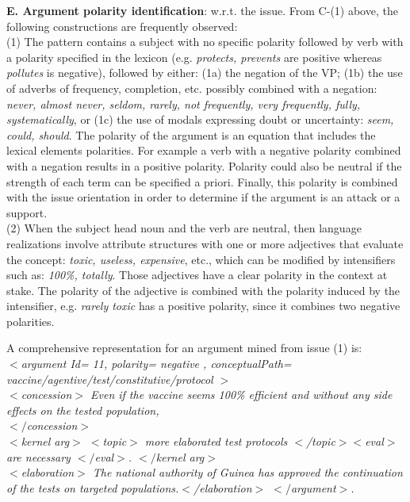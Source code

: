 \documentclass[11pt,letterpaper]{article}
\begin{document}
{\bf E.  Argument polarity identification}: %
 w.r.t. the issue. From C-(1) above,
the following constructions are frequently observed:\\
(1) The pattern contains a subject with no specific polarity followed by verb with a  polarity specified in the lexicon (e.g. {\it  protects, prevents} are positive whereas {\it pollutes} is negative), followed by either: (1a) the negation of the VP;
(1b) the use of adverbs of frequency, completion, etc. possibly combined with a negation: {\it  never, almost never, seldom, rarely, not frequently, very frequently, fully, systematically}, or (1c) the
use of modals expressing doubt or uncertainty: {\it seem, could, should}. The polarity of the argument is an equation that includes the lexical elements polarities. For example a verb with a negative polarity combined with a negation results in a positive polarity. Polarity could also be neutral if the strength of each term can be specified a priori. Finally, this polarity is combined with the issue orientation in order to determine if the argument is an attack or a support. \\
(2) When the subject head noun and the verb are neutral, then language realizations involve attribute structures with one or more adjectives that evaluate the concept: {\it toxic, useless, expensive}, etc., which can
be modified by intensifiers such as: {\it 100\%, totally}. Those adjectives have a clear polarity in the context at stake.
The polarity of the adjective is combined with the polarity induced by the intensifier, e.g. {\it rarely toxic} has a positive polarity, since it combines two negative polarities.

A comprehensive  representation for an argument mined from issue (1) is:\\
{\it {\small
$<$argument Id= 11,  polarity= negative ,         conceptualPath= vaccine/agentive/test/constitutive/protocol $>$\\
$<$concession$>$ Even if the vaccine seems 100\% efficient and without any side effects on the  tested population, \\$</$concession$>$ \\ $<$kernel arg$>$
$<$topic$>$ more elaborated test protocols $<$/topic$> <$eval$>$ are necessary $</$eval$>$.  $</$kernel arg$>$\\  $<$elaboration$>$ The national authority of Guinea has approved the continuation of the tests on targeted populations.$<$/elaboration$>$  $</$argument$>$.}}
\end{document}
